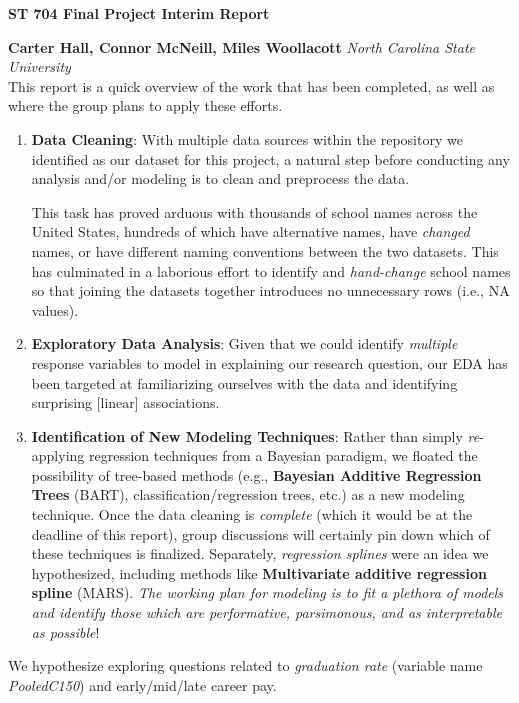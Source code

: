 \documentclass[a4paper,10pt]{article}
\begin{document}
\noindent 
\begin{center}
\textbf{{\Large ST 704 Final Project Interim Report}} \\
\end{center}

\noindent 
\textbf{Carter Hall, Connor McNeill, Miles Woollacott} \textit{North Carolina State University}
\\

\noindent
This report is a quick overview of the work that has been completed, as well as where the group plans to apply these efforts.
\begin{enumerate}
    \item \textbf{Data Cleaning}: With multiple data sources within the repository we identified as our dataset for this project, a natural step before conducting any analysis and/or modeling is to clean and preprocess the data. 

    This task has proved arduous with thousands of school names across the United States, hundreds of which have alternative names, have \textit{changed} names, or have different naming conventions between the two datasets. This has culminated in a laborious effort to identify and \textit{hand-change} school names so that joining the datasets together introduces no unnecessary rows (i.e., NA values).  
    \item \textbf{Exploratory Data Analysis}: Given that we could identify \textit{multiple} response variables to model in explaining our research question, our EDA has been targeted at familiarizing ourselves with the data and identifying surprising [linear] associations. 
    \item \textbf{Identification of New Modeling Techniques}: Rather than simply \textit{re}-applying regression techniques from a Bayesian paradigm, we floated the possibility of tree-based methods (e.g., \textbf{Bayesian Additive Regression Trees} (BART), classification/regression trees, etc.) as a new modeling technique. Once the data cleaning is \textit{complete} (which it would be at the deadline of this report), group discussions will certainly pin down which of these techniques is finalized. Separately, \textit{regression splines} were an idea we hypothesized, including methods like \textbf{Multivariate additive regression spline} (MARS). \textit{The working plan for modeling is to fit a plethora of models and identify those which are performative, parsimonous, and as interpretable as possible}! 
\end{enumerate}
We hypothesize exploring questions related to \textit{graduation rate} (variable name \textit{PooledC150}) and early/mid/late career pay.
\end{document}
